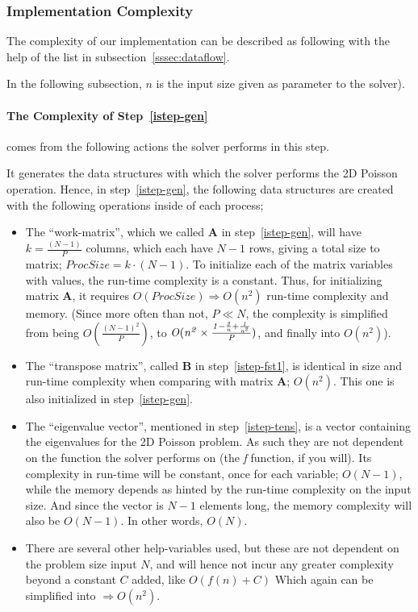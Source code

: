 \documentclass[fontsize=11pt,paper=a4,titlepage]{article}
\begin{document}
\subsubsection{Implementation Complexity}

The complexity of our implementation can be described as following with the help
of the list in subsection~\ref{sssec:dataflow}.

In the following subsection, $n$ is the input size given as parameter to the
solver).

\paragraph{The Complexity of Step~\ref{istep-gen}} comes from the following
actions the solver performs in this step.

It generates the data structures with which the solver performs the 2D Poisson
operation. Hence, in step~\ref{istep-gen}, the following data structures are
created with the following operations inside of each process;

\begin{itemize}
	\item The ``work-matrix'', which we called $\mathbf{A}$ in
	step~\ref{istep-gen}, will have $k = \frac{(N-1)}{P}$ columns, which each
	have $N-1$ rows, giving a total size to matrix; $ProcSize = k\cdot(N-1)$.
	To initialize each of the matrix variables with values, the run-time
	complexity is a constant. Thus, for initializing matrix $\mathbf{A}$, it
	requires $\textit{O}(ProcSize)\Rightarrow \textit{O}(n^2)$ run-time
	complexity and memory. (Since more often than not, $P \ll N$, the complexity
	is simplified from being $\textit{O}(\frac{(N-1)^2}{P})$, to $\it
	{O}(n^2\times \frac{1-\frac{2}{n}+\frac{1}{n^2}}{P})$, and finally into
	$\textit{O}(n^2)$).

	\item The ``transpose matrix'', called $\mathbf{B}$ in
	step~\ref{istep-fst1}, is identical in size and run-time complexity when
	comparing with matrix $\mathbf{A}$; $\textit{O}(n^2)$. This one is also
	initialized in step~\ref{istep-gen}.

	\item The ``eigenvalue vector'', mentioned in step~\ref{istep-tens}, is a
	vector containing the eigenvalues for the 2D Poisson problem. As such they
	are not dependent on the function the solver performs on (the \emph{f}
	function, if you will). Its complexity in run-time will be constant, once
	for each variable; $\textit{O}(N-1)$, while the memory depends as hinted
	by the run-time complexity on the input size. And since the vector is $N-1$
	elements long, the memory complexity will also be $\textit{O}(N-1)$.
	In other words, $\textit{O}(N)$.

	\item There are several other help-variables used, but these are not
	dependent on the problem size input $N$, and will hence not incur any
	greater complexity beyond a constant $C$ added, like $\textit{O}(f(n) + C)$
	Which again can be simplified into $\Rightarrow \textit{O}(n^2)$.
\end{itemize}
\end{document}
